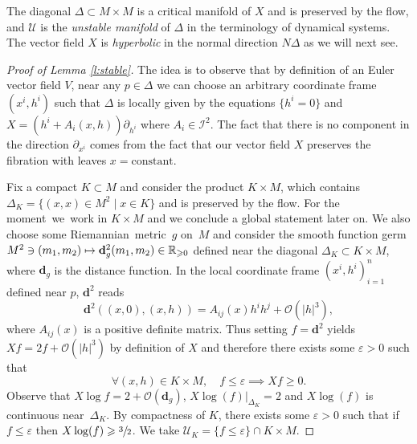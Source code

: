 \documentclass[10pt]{amsart}
\let\pazocal\mathscr
\def\mto{\mathchoice{\longmapsto}{\mapsto}{\mapsto}{\mapsto}}
\theoremstyle{definition}
\newenvironment{refproof}[1]{\begin{proof}[Proof of {#1}]}{\end{proof}}
\let\st\mid
\let\euler X
\begin{document}
The diagonal $\Delta\subset M\times M$
is a critical manifold of $\euler$
and is preserved by the flow, and $\pazocal{U}$
is the \emph{unstable manifold}
of $\Delta$ in the terminology
of dynamical systems.
The vector field $\euler$ is
\emph{hyperbolic} in the normal direction $N\Delta$
as we will next see.

\begin{refproof}{Lemma \ref{l:stable}} The idea is to observe that by definition of an Euler vector field $V$, near any $p\in \Delta$ we can choose an arbitrary coordinate frame $(x^i,h^i)$ such that $\Delta$ is locally given by the equations $\{h^i=0\}$ and $\euler=(h^i+A_i(x,h))\partial_{h^i}$ where $A_i\in \pazocal{I}^2$. The fact that there is no component in the direction $\partial_{x^i}$
comes from the fact that our vector field $\euler$ preserves the fibration with leaves $x=\text{constant}$.

Fix a compact $K\subset M$ and consider the product $K\times M $,
which contains $\Delta_K=\{(x,x)\!\in\! M^2 \st x\!\in\!K\}$ and is preserved by the flow.
For the \hbox{moment we work} in $K\!\times\!M$ and we conclude a global statement later on.
We also choose some \hbox{Riemannian metric~$g$} on~$M$ and consider the smooth function germ $M^2 \ni (m_1,m_2)\mto \mathbf{d}_g^2(m_1,m_2)\in \mathbb{R}_{\geqslant 0} $
defined near the diagonal $\Delta_K\subset K\times M$, where $\mathbf{d}_g$ is the distance function.
In the local coordinate frame $(x^i,h^i)_{i=1}^n$ defined near $p$, $\mathbf{d}^2$ reads
\[
\mathbf{d}^2((x,0),(x,h)) = A_{ij}(x)h^ih^j+\pazocal{O}(\vert h\vert^3),
\]
where $A_{ij}(x)$ is a positive definite matrix. Thus setting $f=\mathbf{d}^2$ yields
$\euler f=2f+\pazocal{O}(\vert h\vert^3)$ by definition of $\euler$
and
therefore there exists some
$\varepsilon>0$ such that
\[
\forall (x,h)\in K\times M,\quad f\leqslant \varepsilon\implies \euler f\geqslant 0.
\]
Observe that $\euler \log f=2+\pazocal{O}(\mathbf{d}_g) $, $\euler \log(f)|_{\Delta_K}=2$ and $\euler \log(f)$ is continuous near~$\Delta_K$.
By compactness of $K$, there exists some $\varepsilon>0$ such that if $f\leqslant \varepsilon$
then $\euler \log(f)\geqslant \sfrac{3}{2}$.
We take $\pazocal{U}_K=\{f\leqslant \varepsilon\}\cap K\times M$.


\end{refproof}
\end{document}
